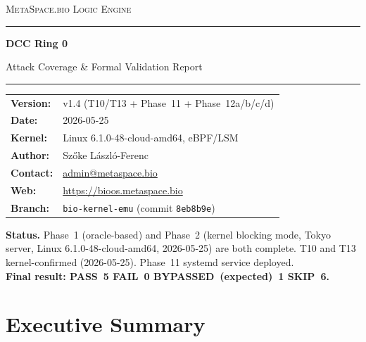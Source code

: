 \documentclass[11pt,a4paper]{article}
\theoremstyle{definition}
\begin{document}
\begin{titlepage}
  \centering
  \vspace*{2cm}
  {\large\scshape MetaSpace.bio Logic Engine\par}
  \vspace{0.5cm}
  {\color{dccblue}\rule{\linewidth}{1.5pt}\par}
  \vspace{1cm}
  {\Huge\bfseries DCC Ring 0\par}
  \vspace{0.4cm}
  {\Large Attack Coverage \& Formal Validation Report\par}
  \vspace{1cm}
  {\color{dccblue}\rule{\linewidth}{0.8pt}\par}
  \vspace{1.5cm}
  \begin{tabular}{ll}
    \textbf{Version:}  & v1.4 (T10/T13 + Phase~11 + Phase~12a/b/c/d) \\[4pt]
    \textbf{Date:}     & 2026-05-25 \\[4pt]
    \textbf{Kernel:}   & Linux 6.1.0-48-cloud-amd64, eBPF/LSM \\[4pt]
    \textbf{Author:}   & Szőke László-Ferenc \\[4pt]
    \textbf{Contact:}  & \href{mailto:admin@metaspace.bio}{admin@metaspace.bio} \\[4pt]
    \textbf{Web:}      & \url{https://bioos.metaspace.bio} \\[4pt]
    \textbf{Branch:}   & \texttt{bio-kernel-emu} (commit \texttt{8eb8b9e}) \\
  \end{tabular}
  \vfill
  \begin{notebox}
  \textbf{Status.} Phase~1 (oracle-based) and Phase~2 (kernel blocking mode,
  Tokyo server, Linux 6.1.0-48-cloud-amd64, 2026-05-25) are both complete.
  T10 and T13 kernel-confirmed (2026-05-25). Phase~11 systemd service deployed.\\
  \textbf{Final result: PASS~5 \quad FAIL~0 \quad BYPASSED~(expected)~1 \quad SKIP~6.}
  \end{notebox}
\end{titlepage}

\section*{Executive Summary}
\end{document}

